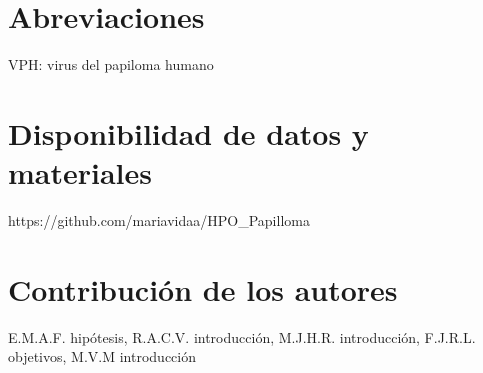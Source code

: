 \documentclass{bmcart}
\begin{document}
\begin{frontmatter}
\begin{abstractbox}
\begin{abstract}
			
			\end{abstract}
			
			
			\begin{keyword}
			\end{keyword}
		
		
		\end{abstractbox}
	
	\end{frontmatter}
	
	
	

	
	
	
	
	
	
	
	
	
	
	\begin{backmatter}
	
		\section*{Abreviaciones}%
			VPH: virus del papiloma humano
		
		\section*{Disponibilidad de datos y materiales}%
			https://github.com/mariavidaa/HPO\_Papilloma
		
		\section*{Contribución de los autores}
			E.M.A.F. hipótesis, R.A.C.V. introducción, M.J.H.R. introducción, F.J.R.L. objetivos, M.V.M introducción
		
		
		
	
	\end{backmatter}
\end{document}
